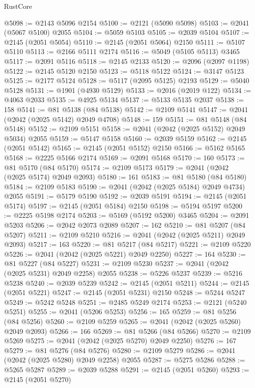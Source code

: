 \begin{lexlean}{RustCore}
\begin{coremodule}
@5098 := @2143 @5096 @2154
@5100 := @2121 (@5090 @5098)
@5103 := @2041 (@5067 @5100) @2055
@5104 := @5059 @5103
@5105 := @2039 @5104
@5107 := @2145 (@2051 @5054)
@5110 := @2145 (@2051 @5064) @2150
@5111 := @5107 @5110
@5113 := @2166 @5111 @2174
@5116 := @5049 (@5105 @5113) @3465
@5117 := @2091 @5116
@5118 := @2145 @2133
@5120 := @2096 (@2097 @1198)
@5122 := @2145 @5120 @2150
@5123 := @5118 @5122
@5124 := @3147 @5123
@5125 := @2177 @5124
@5128 := @5117 (@2095 @5125) @2193
@5129 := @5040 @5128
@5131 := @1901 (@4930 @5129)
@5133 := @2016 (@2019 @122)
@5134 := @4063 @2033
@5135 := @4925 @5134
@5137 := @5133 @5135 @2037
@5138 := 158
@5141 := @81 @5138 (@84 @5138)
@5142 := @2109 @5141
@5147 := @2041 (@2042 (@2025 @5142) @2049 @4708)
@5148 := 159
@5151 := @81 @5148 (@84 @5148)
@5152 := @2109 @5151
@5158 := @2041 (@2042 (@2025 @5152) @2049 @5034) @2055
@5159 := @5147 @5158
@5160 := @2039 @5159
@5162 := @2145 (@2051 @5142)
@5165 := @2145 (@2051 @5152) @2150
@5166 := @5162 @5165
@5168 := @2225 @5166 @2174
@5169 := @2091 @5168
@5170 := 160
@5173 := @81 @5170 (@84 @5170)
@5174 := @2109 @5173
@5179 := @2041 (@2042 (@2025 @5174) @2049 @2093)
@5180 := 161
@5183 := @81 @5180 (@84 @5180)
@5184 := @2109 @5183
@5190 := @2041 (@2042 (@2025 @5184) @2049 @4734) @2055
@5191 := @5179 @5190
@5192 := @2039 @5191
@5194 := @2145 (@2051 @5174)
@5197 := @2145 (@2051 @5184) @2150
@5198 := @5194 @5197
@5200 := @2225 @5198 @2174
@5203 := @5169 (@5192 @5200) @3465
@5204 := @2091 @5203
@5206 := @2042 @2073 @2089
@5207 := 162
@5210 := @81 @5207 (@84 @5207)
@5211 := @2109 @5210
@5216 := @2041 (@2042 (@2025 @5211) @2049 @2093)
@5217 := 163
@5220 := @81 @5217 (@84 @5217)
@5221 := @2109 @5220
@5226 := @2041 (@2042 (@2025 @5221) @2049 @2250)
@5227 := 164
@5230 := @81 @5227 (@84 @5227)
@5231 := @2109 @5230
@5237 := @2041 (@2042 (@2025 @5231) @2049 @2258) @2055
@5238 := @5226 @5237
@5239 := @5216 @5238
@5240 := @2039 @5239
@5242 := @2145 (@2051 @5211)
@5244 := @2145 (@2051 @5221)
@5247 := @2145 (@2051 @5231) @2150
@5248 := @5244 @5247
@5249 := @5242 @5248
@5251 := @2485 @5249 @2174
@5253 := @2121 (@5240 @5251)
@5255 := @2041 (@5206 @5253)
@5256 := 165
@5259 := @81 @5256 (@84 @5256)
@5260 := @2109 @5259
@5265 := @2041 (@2042 (@2025 @5260) @2049 @2093)
@5266 := 166
@5269 := @81 @5266 (@84 @5266)
@5270 := @2109 @5269
@5275 := @2041 (@2042 (@2025 @5270) @2049 @2250)
@5276 := 167
@5279 := @81 @5276 (@84 @5276)
@5280 := @2109 @5279
@5286 := @2041 (@2042 (@2025 @5280) @2049 @2258) @2055
@5287 := @5275 @5286
@5288 := @5265 @5287
@5289 := @2039 @5288
@5291 := @2145 (@2051 @5260)
@5293 := @2145 (@2051 @5270)

\end{coremodule}
\end{lexlean}
